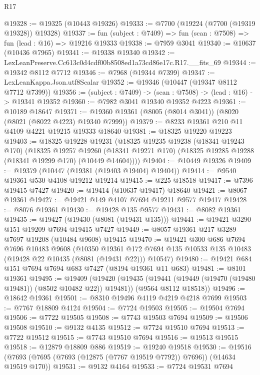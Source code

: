 \begin{lexlean}{R17}
\begin{coremodule}
@19328 := @19325 (@10443 @19326)
@19333 := @7700 (@19224 (@7700 (@19319 @19328)) @19328)
@19337 := fun (subject : @7409) => fun (scan : @7508) => fun (lead : @16) => @19216 @19333
@19338 := @7959 @3041
@19340 := @10637 (@10436 @7965)
@19341 := @19338 @19340
@19342 := LexLeanPreserve.Cc613c0d4cdf00b8508ed1a73cd86e17c.R17.__fits_69
@19344 := @19342 @8112 @7712
@19346 := @7968 (@19344 @7399)
@19347 := LexLeanKappa.Json.utf8Scalar
@19352 := @19346 (@10447 (@19347 @8112 @7712 @7399))
@19356 := (subject : @7409) -> (scan : @7508) -> (lead : @16) -> @19341 @19352
@19360 := @7982 @3041 @19340 @19352 @4223
@19361 := @10189 @18647
@19371 := @19360 @19361 (@8005 (@8014 @3041)) (@8020 (@8021 (@8022 @4223) @19340 @7999))
@19379 := @8233 @19361 @210 @11 @4109 @4221 @19215 @19333 @18640
@19381 := @18325 @19220 @19223
@19403 := @18325
    @19228
    @19231
    (@18325
      @19235
      @19238
      (@18341 @19243 @170)
      (@18325
        @19257
        @19260
        (@18341 @19271 @170)
        (@18325 @19285 @19288 (@18341 @19299 @170) (@10449 @14604))))
@19404 := @10449 @19326
@19409 := @19379 (@10447 (@19381 (@19403 @19404) @19404))
@19414 := @9540 @19361 @530 @4108 @19212 @19214
@19415 := @225 @18518
@19417 := @7396 @19415 @7427
@19420 := @19414 (@10637 @19417) @18640
@19421 := @8067 @19361
@19427 := @19421 @149 @4107 @7694 @19211 @9577 @19417
@19428 := @8076 @19361
@19430 := @19428 @135 @9577
@19431 := @8082 @19361
@19435 := @19427 (@19430 (@8081 (@19431 @135)))
@19441 := @19421 @3290 @151 @19209 @7694 @19415 @7427
@19449 := @8057 @19361 @217 @3289 @7697 @19208 (@10484 @9608) @19415
@19470 := @19421
    @300
    @686
    @7694
    @7696
    @10483
    @9608
    (@10350
      @19361
      @172
      @7694
      @135
      @10533
      @135
      @10483
      (@19428 @22 @10435 (@8081 (@19431 @22)))
      @10547)
@19480 := @19421 @684 @151 @7694 @7694 @683 @7427 (@8194 @19361 @11 @683)
@19481 := @8101 @19361
@19495 := @19409
    (@19420
      (@19435 (@19441 (@19449 (@19470 (@19480 @19481)) (@8502 @10482 @22)) @19481))
      (@9564 @8112 @18518))
@19496 := @18642 @19361
@19501 := @8310 @19496 @4119 @4219 @4218 @7699
@19503 := @7767 @18809 @4124
@19504 := @7724 @19503
@19505 := @19504 @7694
@19506 := @7722 @19505
@19508 := @7743 @19503 @7694
@19509 := @19506 @19508
@19510 := @9132 @4135
@19512 := @7724 @19510 @7694
@19513 := @7722 @19512
@19515 := @7743 @19510 @7694
@19516 := @19513 @19515
@19518 := @12879 @18809 @886
@19519 := @19240 @19518
@19530 := @19516 (@7693 (@7695 (@7693 (@12875 (@7767 @19519 @7792)) @7696)) (@14634 @19519 @170))
@19531 := @9132 @4164
@19533 := @7724 @19531 @7694

\end{coremodule}
\end{lexlean}
